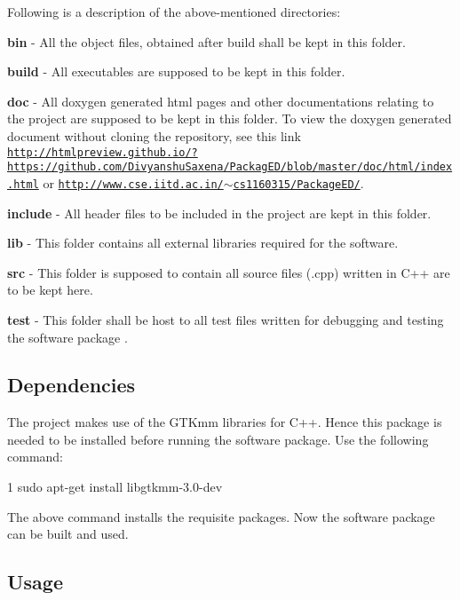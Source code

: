 Following is a description of the above-\/mentioned directories\+:
\begin{DoxyEnumerate}
\item {\bfseries bin} -\/ All the object files, obtained after build shall be kept in this folder.
\item {\bfseries build} -\/ All executables are supposed to be kept in this folder.
\item {\bfseries doc} -\/ All doxygen generated html pages and other documentations relating to the project are supposed to be kept in this folder. To view the doxygen generated document without cloning the repository, see this link \href{http://htmlpreview.github.io/?https://github.com/DivyanshuSaxena/PackagED/blob/master/doc/html/index.html}{\tt http\+://htmlpreview.\+github.\+io/?https\+://github.\+com/\+Divyanshu\+Saxena/\+Packag\+E\+D/blob/master/doc/html/index.\+html} or \href{http://www.cse.iitd.ac.in/~cs1160315/PackageED/}{\tt http\+://www.\+cse.\+iitd.\+ac.\+in/$\sim$cs1160315/\+Package\+E\+D/}.
\item {\bfseries include} -\/ All header files to be included in the project are kept in this folder.
\item {\bfseries lib} -\/ This folder contains all external libraries required for the software.
\item {\bfseries src} -\/ This folder is supposed to contain all source files (.cpp) written in C++ are to be kept here.
\item {\bfseries test} -\/ This folder shall be host to all test files written for debugging and testing the software package .
\end{DoxyEnumerate}

\subsection*{Dependencies}

The project makes use of the G\+T\+Kmm libraries for C++. Hence this package is needed to be installed before running the software package. Use the following command\+: 
\begin{DoxyCode}
1 sudo apt-get install libgtkmm-3.0-dev
\end{DoxyCode}
 The above command installs the requisite packages. Now the software package can be built and used.

\subsection*{Usage}

